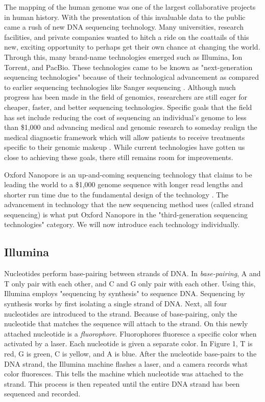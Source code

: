\documentclass[12pt,letterpaper]{report}
\begin{document}
The mapping of the human genome was one of the largest collaborative projects in human history. With the presentation of this invaluable data to the public came a rush of new DNA sequencing technology. Many universities, research facilities, and private companies wanted to hitch a ride on the coattails of this new, exciting opportunity to perhaps get their own chance at changing the world. Through this, many brand-name technologies emerged such as Illumina, Ion Torrent, and PacBio. These technologies came to be known as "next-generation sequencing technologies" because of their technological advancement as compared to earlier sequencing technologies like Sanger sequencing \cite{Shendure}. Although much progress has been made in the field of genomics, researchers are still eager for cheaper, faster, and better sequencing technologies. Specific goals that the field has set include reducing the cost of sequencing an individual's genome to less than \$1,000 and advancing medical and genomic research to someday realign the medical diagnostic framework which will allow patients to receive treatments specific to their genomic makeup \cite{Salto-Tellez}. While current technologies have gotten us close to achieving these goals, there still remains room for improvements.

Oxford Nanopore is an up-and-coming sequencing technology that claims to be leading the world to a \$1,000 genome sequence with longer read lengths and shorter run time due to the fundamental design of the technology \cite{Maitra}. The advancement in technology that the new sequencing method uses (called strand sequencing) is what put Oxford Nanopore in the "third-generation sequencing technologies" category. We will now introduce each technology individually.

	
\subsection{Illumina}

Nucleotides perform base-pairing between strands of DNA. In \textit{base-pairing}, A and T only pair with each other, and C and G only pair with each other. Using this, Illumina employs "sequencing by synthesis" to sequence DNA. Sequencing by synthesis works by first isolating a single strand of DNA. Next, all four nucleotides are introduced to the strand. Because of base-pairing, only the nucleotide that matches the sequence will attach to the strand. On this newly attached nucleotide is a \textit{fluorophore}. Fluorophores fluoresce a specific color when activated by a laser. Each nucleotide is given a separate color. In Figure 1, T is red, G is green, C is yellow, and A is blue. After the nucleotide base-pairs to the DNA strand, the Illumina machine flashes a laser, and a camera records what color fluoresces. This tells the machine which nucleotide was attached to the strand. This process is then repeated until the entire DNA strand has been sequenced and recorded.
\end{document}
